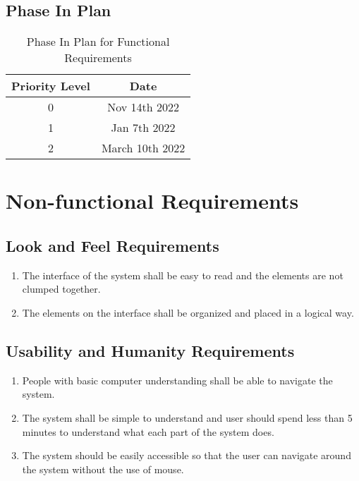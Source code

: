 \documentclass[12pt, titlepage]{article}
\begin{document}
\subsection{Phase In Plan}
\begin{table}[h]
\begin{center}
\begin{tabular}{|c|c|}
\hline
    Priority Level & Date \\
    \hline
    0 & Nov 14th 2022 \\
    1 & Jan 7th 2022 \\
    2 & March 10th 2022 \\
    \hline
\end{tabular}
\end{center}
\caption{Phase In Plan for Functional Requirements}            

\end{table}


\section{Non-functional Requirements}

\subsection{Look and Feel Requirements}
\begin{enumerate}[label=NFR.\arabic*]
    \item The interface of the system shall be easy to read and the elements are not clumped together. \label{NFR.1}
    \item The elements on the interface shall be organized and placed in a logical way. \label{NFR.2}
\end{enumerate}

\subsection{Usability and Humanity Requirements}
\begin{enumerate}[label=NFR.\arabic*, resume]
    \item People with basic computer understanding shall be able to navigate the system. \label{NFR.3}
    \item The system shall be simple to understand and user should spend less than 5 minutes to understand what each part of the system does. \label{NFR.4}
    \item The system should be easily accessible so that the user can navigate around the system without the use of mouse. \label{NFR.5}
\end{enumerate}
\end{document}
